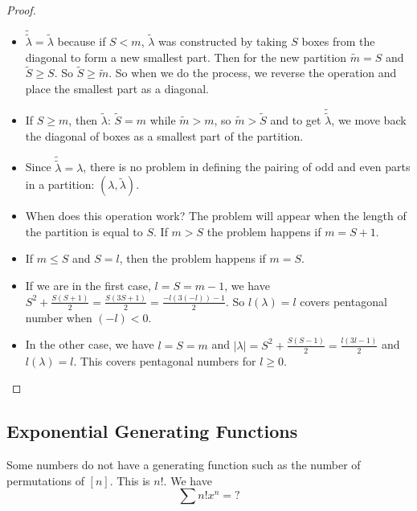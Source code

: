 \documentclass{report}
\begin{document}
\begin{proof}
\begin{itemize}
                \item  $\tilde{\tilde{\lambda}} = \tilde{\lambda}$ because if $S < m$, $ \tilde{\lambda}$ was constructed by taking $S$ boxes from the diagonal to form a new smallest part. Then for the new partition $\tilde{m} = S$ and $\tilde{S} \geq S$. So $\tilde{S} \geq \tilde{m}$. So when we do the process, we reverse the operation and place the smallest part as a diagonal.

                \item If $S \geq m$, then $\tilde{\lambda}$: $\tilde{S} = m$ while $\tilde{m} > m$, so $\tilde{m} > \tilde{S}$ and to get $\tilde{\tilde{\lambda}}$, we move back the diagonal of boxes as a smallest part of the partition.

                \item Since $\tilde{\tilde{\lambda}} = \lambda$, there is no problem in defining the pairing of odd and even parts in a partition: $(\lambda, \tilde{\lambda})$.

                \item When does this operation work? The problem will appear when the length of the partition is equal to $S$. If $m > S$ the problem happens if $m = S + 1$.

                \item If $m \leq S$ and $S = l$, then the problem happens if $m = S$.

                \item If we are in the first case, $l = S = m - 1$, we have $S^{2} + \frac{S(S + 1)}{2} = \frac{S(3S + 1)}{2} = \frac{-l(3(-l))- 1}{2}$. So $l(\lambda) = l$ covers pentagonal number when $(-l) < 0$.

                \item In the other case, we have $l = S = m$ and $\lvert \lambda \rvert = S^{2} + \frac{S(S - 1)}{2} = \frac{l(3l - 1)}{2}$ and $l(\lambda) = l$. This covers pentagonal numbers for $l \geq 0$.
            \end{itemize}
    \end{proof}

\begin{topic}
    \section{Exponential Generating Functions}
\end{topic}

Some numbers do not have a generating function such as the number of permutations of $[n]$. This is $n!$. We have
    \begin{equation*}
        \sum n!x^{n} = ?
    \end{equation*}
\end{document}
